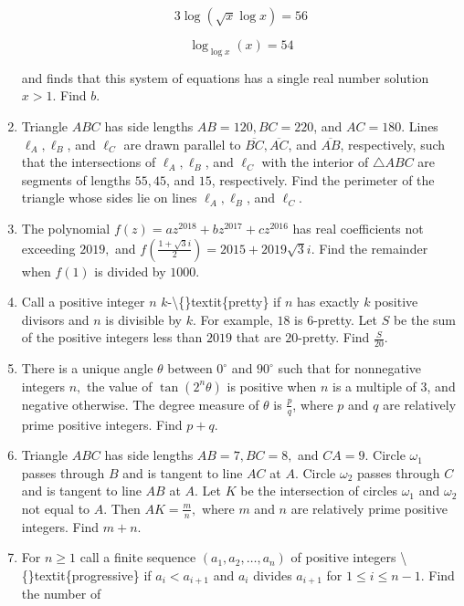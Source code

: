 \documentclass{article}
\begin{document}
\begin{enumerate}[label=\arabic*., itemsep=0.5em]
\begin{equation*}
3\log(\sqrt{x}\log x)=56
\end{equation*}


\begin{equation*}
\log_{\log x}(x)=54
\end{equation*}

and finds that this system of equations has a single real number solution \(x>1\). Find \(b\).\par \vspace{0.5em}\item Triangle \(ABC\) has side lengths \(AB=120,BC=220\), and \(AC=180\). Lines \(\ell_A,\ell_B\), and \(\ell_C\) are drawn parallel to \(\overline{BC},\overline{AC}\), and \(\overline{AB}\), respectively, such that the intersections of \(\ell_A,\ell_B\), and \(\ell_C\) with the interior of \(\triangle ABC\) are segments of lengths \(55,45\), and \(15\), respectively. Find the perimeter of the triangle whose sides lie on lines \(\ell_A,\ell_B\), and \(\ell_C\).\par \vspace{0.5em}\item The polynomial \(f(z)=az^{2018}+bz^{2017}+cz^{2016}\) has real coefficients not exceeding \(2019,\) and \(f\left(\tfrac{1+\sqrt3i}{2}\right)=2015+2019\sqrt3i\). Find the remainder when \(f(1)\) is divided by \(1000\).\par \vspace{0.5em}\item Call a positive integer \(n\) \(k\)-\textbackslash\{\}textit\{pretty\} if \(n\) has exactly \(k\) positive divisors and \(n\) is divisible by \(k\). For example, \(18\) is \(6\)-pretty. Let \(S\) be the sum of the positive integers less than \(2019\) that are \(20\)-pretty. Find \(\tfrac{S}{20}\).\par \vspace{0.5em}\item There is a unique angle \(\theta\) between \(0^\circ\) and \(90^\circ\) such that for nonnegative integers \(n,\) the value of \(\tan(2^n\theta)\) is positive when \(n\) is a multiple of \(3\), and negative otherwise. The degree measure of \(\theta\) is \(\tfrac{p}{q}\), where \(p\) and \(q\) are relatively prime positive integers. Find \(p+q\).\par \vspace{0.5em}\item Triangle \(ABC\) has side lengths \(AB=7,BC=8,\) and \(CA=9.\) Circle \(\omega_1\) passes through \(B\) and is tangent to line \(AC\) at \(A.\) Circle \(\omega_2\) passes through \(C\) and is tangent to line \(AB\) at \(A.\) Let \(K\) be the intersection of circles \(\omega_1\) and \(\omega_2\) not equal to \(A.\) Then \(AK=\tfrac{m}{n},\) where \(m\) and \(n\) are relatively prime positive integers. Find \(m+n.\)\par \vspace{0.5em}\item For \(n\ge1\) call a finite sequence \((a_1,a_2,\ldots,a_n)\) of positive integers \textbackslash\{\}textit\{progressive\} if \(a_i<a_{i+1}\) and \(a_i\) divides \(a_{i+1}\) for \(1\le i\le n-1\). Find the number of 
\end{enumerate}
\end{document}
